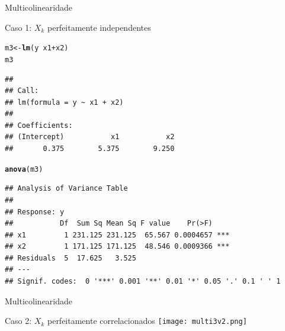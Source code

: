 \documentclass{beamer}\usepackage[]{graphicx}\usepackage[]{color}
\makeatletter
\newcommand{\hlopt}[1]{\textcolor[rgb]{0,0,0}{#1}}%
\newcommand{\hlstd}[1]{\textcolor[rgb]{0.345,0.345,0.345}{#1}}%
\newcommand{\hlkwb}[1]{\textcolor[rgb]{0.69,0.353,0.396}{#1}}%
\newcommand{\hlkwd}[1]{\textcolor[rgb]{0.737,0.353,0.396}{\textbf{#1}}}%
\newenvironment{kframe}{%
 \def\at@end@of@kframe{}%
 \ifinner\ifhmode%
  \def\at@end@of@kframe{\end{minipage}}%
  \begin{minipage}{\columnwidth}%
 \fi\fi%
 \def\FrameCommand##1{\hskip\@totalleftmargin \hskip-\fboxsep
 \colorbox{shadecolor}{##1}\hskip-\fboxsep
     \hskip-\linewidth \hskip-\@totalleftmargin \hskip\columnwidth}%
 \MakeFramed {\advance\hsize-\width
   \@totalleftmargin\z@ \linewidth\hsize
   \@setminipage}}%
 {\par\unskip\endMakeFramed%
 \at@end@of@kframe}
\newenvironment{knitrout}{}{} %
\renewenvironment{knitrout}{\setlength{\topsep}{0mm}}{}
\makeatother
\begin{document}
\begin{frame}[fragile]{Multicolinearidade}

Caso 1: $X_k$ perfeitamente independentes
\vfill

\begin{knitrout}\tiny
{}\color{fgcolor}\begin{kframe}
\begin{alltt}
\hlstd{m3} \hlkwb{<-} \hlkwd{lm}\hlstd{(y} \hlopt{~} \hlstd{x1} \hlopt{+} \hlstd{x2)}
\hlstd{m3}
\end{alltt}
\begin{verbatim}
## 
## Call:
## lm(formula = y ~ x1 + x2)
## 
## Coefficients:
## (Intercept)           x1           x2  
##       0.375        5.375        9.250
\end{verbatim}
\begin{alltt}
\hlkwd{anova}\hlstd{(m3)}
\end{alltt}
\begin{verbatim}
## Analysis of Variance Table
## 
## Response: y
##           Df  Sum Sq Mean Sq F value    Pr(>F)    
## x1         1 231.125 231.125  65.567 0.0004657 ***
## x2         1 171.125 171.125  48.546 0.0009366 ***
## Residuals  5  17.625   3.525                      
## ---
## Signif. codes:  0 '***' 0.001 '**' 0.01 '*' 0.05 '.' 0.1 ' ' 1
\end{verbatim}
\end{kframe}
\end{knitrout}

\end{frame}



\begin{frame}{Multicolinearidade}
 
Caso 2: $X_k$ perfeitamente correlacionados
\vfill
\texttt{[image: multi3v2.png]}

\end{frame}
\end{document}
